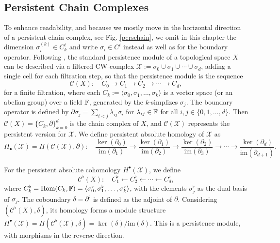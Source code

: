 \subsection{Persistent Chain Complexes}
To enhance readability, and because we mostly move in the horizontal direction of a persistent chain complex, see Fig. \ref{perschain}, we omit in this chapter the dimension $\sigma^{(k)}_i \in C^i_k$ and write $\sigma_i \in C^i$ instead as well as for the boundary operator. Following \cite[\S 2.6]{de2011dualities}, the standard persistence module of a topological space $X$ can be described via a filtered CW-complex $\mathcal{X}:= \sigma_0 \cup \sigma_1 \cup \cdots \cup \sigma_d$, adding a single cell for each filtration step, so that the persistence module is the sequence
\[
	\mathcal{C}(X): \quad C_{0} \to C_{1} \to C_{2} \to \cdots \to C_{d},
\]
for a finite filtration, where each $C_{k} := \langle \sigma_0, \sigma_1, \ldots, \sigma_k \rangle$ is a vector space (or an abelian group) over a field ${\mathbb{F}}$, generated by the $k$-simplizes $\sigma_j$. The boundary operator is defined by $\partial \sigma_{j} = \sum_{i<j}\lambda_{ij}\sigma_{i}$ for $\lambda_{ij}\in {\mathbb{F}}$ for all $i, j \in \{0, 1, \ldots, d\}$. Then $\mathcal{C}(X) = \{C_{k},\partial\}_{k=0}^{d}$ is the chain complex of $X$, and $\mathcal{C}(\mathcal{X})$ represents the persistent version for $\mathcal{X}$. We define persistent absolute homology of $\mathcal{X}$ as
\[
	H_{\bullet}(\mathcal{X}) = H(\mathcal{C}(\mathcal{X}), \partial): \quad \frac{\ker(\partial_{0})}{\text{im}(\partial_{1})}
	\to \frac{\ker(\partial_{1})}{\text{im}(\partial_{2})} \to \frac{\ker(\partial_{2})}{\text{im}(\partial_{3})}\to \cdots \to \frac{\ker(\partial_{d})}{\text{im}(\partial_{d+1})}
	.
\]

For the persistent absolute cohomology $H^{\bullet}(\mathcal{X})$, we define
\[
	\label{cohomcomplex}
	\mathcal{C}^{\flat}(X): \quad C^{\flat}_{1} \leftarrow C^{\flat}_{2} \leftarrow \cdots
	\leftarrow C^{\flat}_{d},
\]
where $C^{\flat}_k = \text{Hom}(C_k, {\mathbb{F}}) = \langle \sigma_0^{\flat}, \sigma_1^{\flat}, \ldots, \sigma_k^{\flat} \rangle$, with the elements $\sigma^{\flat}_j$ as the dual basis of $\sigma_j$. The coboundary $\delta= \partial^{\flat}$ is defined as the adjoint of $\partial$. Considering $(\mathcal{C}^{\flat}(X), \delta)$, its homology forms a module structure $H^{\bullet}(\mathcal{X}) = H(\mathcal{C}^{\flat}(\mathcal{X}), \delta) = \ker(\delta) / \text{im}(\delta)$. This is a persistence module, with morphisms in the reverse direction.

